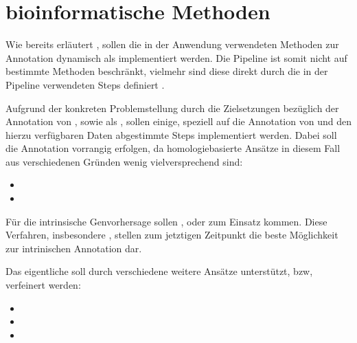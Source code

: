 \section{bioinformatische Methoden}
Wie bereits erläutert , sollen die in
der Anwendung verwendeten Methoden zur Annotation dynamisch als 
implementiert werden. Die Pipeline ist somit nicht auf bestimmte Methoden
beschränkt, vielmehr sind diese direkt durch die in der Pipeline verwendeten
Steps definiert .

Aufgrund der konkreten Problemstellung durch die Zielsetzungen bezüglich der
Annotation von , sowie als ,
sollen einige, speziell auf die Annotation von  und den
hierzu verfügbaren Daten abgestimmte Steps implementiert werden.
Dabei soll die Annotation vorrangig  
erfolgen, da homologiebasierte Ansätze in diesem Fall aus verschiedenen Gründen
wenig vielversprechend sind:
\begin{itemize}
\item {}
\item {}
\end{itemize}
Für die intrinsische Genvorhersage sollen , oder  zum
Einsatz kommen.
Diese Verfahren, insbesondere , stellen zum
jetztigen Zeitpunkt die beste Möglichkeit zur intrinischen Annotation dar.

Das eigentliche  soll durch verschiedene weitere Ansätze
unterstützt, bzw, verfeinert werden:

\begin{itemize}
  \item {}
  \item {}
  \item {}
\end{itemize}



